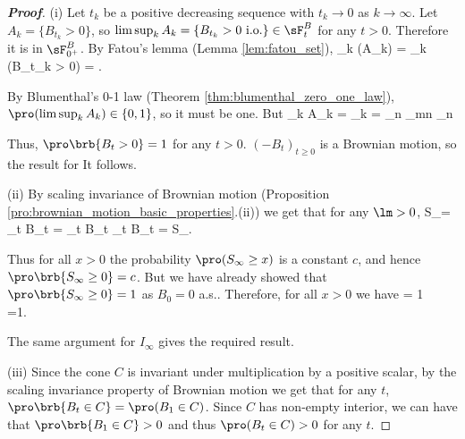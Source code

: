 \begin{proof}[\bf Proof]
\ben
\item [(i)] Let $t_k$ be a positive decreasing sequence with $t_k \to 0$ as $k \to\infty$. Let $A_k = \{B_{t_k} > 0\}$, so $\limsup_{k} A_k = \{B_{t_k} > 0 \text{ i.o.}\}\in \sF^B_t$ for any $t > 0$. Therefore it is in $\sF^B_{0^+}$. By Fatou's lemma (Lemma \ref{lem:fatou_set}),
\be
\pro{} \geq \limsup_k \pro(A_k) = \limsup_k \pro(B_{t_k} > 0) = .
\ee

By Blumenthal's 0-1 law (Theorem \ref{thm:blumenthal_zero_one_law}), $\pro(\limsup_k A_k) \in \{0, 1\}$, so it must be one. But
\be
\limsup_k A_k = \limsup_k  = \bigcap_n \bigcup_{m\geq n} \subseteq \bigcap_n  %
\ee

Thus, $\pro\brb{B_t > 0} = 1$ for any $t >0$. %
$(-B_t)_{t \geq 0}$ is a Brownian motion, so the result for It follows.

\item [(ii)] By scaling invariance of Brownian motion (Proposition \ref{pro:brownian_motion_basic_properties}.(ii)) we get that for any $\lm > 0$,
\be
S_\infty = \sup_{t} B_t = \sup_{t} B_{\lm t}  \sup_{t} \sqrt{\lm }B_t = \sqrt{\lm} S_\infty.
\ee


Thus for all $x>0$ the probability $\pro(S_\infty \geq x)$ is a constant $c$, and hence $\pro\brb{S_\infty \geq 0} =c$. But we have already showed that $\pro\brb{S_\infty \geq 0} = 1$ as $B_0 = 0$ a.s.. Therefore, for all $x >0$ we have
\be
\pro{} = 1 \ \ra \ \pro{} =1.
\ee

The same argument for $I_\infty$ gives the required result.


\item [(iii)] Since the cone $C$ is invariant under multiplication by a positive scalar, by the scaling invariance property of Brownian motion we get that for any $t$, $\pro\brb{B_t\in C} = \pro(B_1\in C)$. Since $C$ has non-empty interior, we can have that $\pro\brb{B_1\in C} >0$ and thus $\pro(B_t \in C) >0$ for any $t$.


\end{proof}
